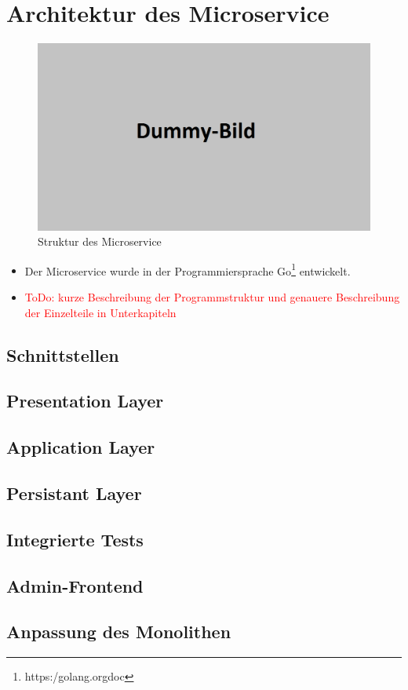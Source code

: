 \section{Architektur des Microservice}
\label{sec: Architektur des Microservice}

\begin{figure}[H]
	\begin{center}
	\includegraphics[width=0.65 \textwidth]{./Bilder/dummy.png}
	\end{center}
	\caption{Struktur des Microservice}
	\label{pic:Struktur des Microservice}
\end{figure}


\begin{itemize}
	\item Der Microservice wurde in der Programmiersprache Go\footnote{https:\//golang.org\/doc\/} entwickelt.
	\item \textcolor{red}{ToDo: kurze Beschreibung der Programmstruktur und genauere Beschreibung der Einzelteile in Unterkapiteln}
\end{itemize}

\subsection{Schnittstellen}
\label{subsec: Schnittstellen}

\subsection{Presentation Layer}
\label{subsec: Presentation Layer}

\subsection{Application Layer}
\label{subsec: Application Layer}

\subsection{Persistant Layer}
\label{subsec: Persistant Layer}

\subsection{Integrierte Tests}
\label{subsec: Integrierte Tests}

\subsection{Admin-Frontend}
\label{subsec: Admin-Frontend}

\subsection{Anpassung des Monolithen}
\label{subsec: Anpassung des Monolithen}